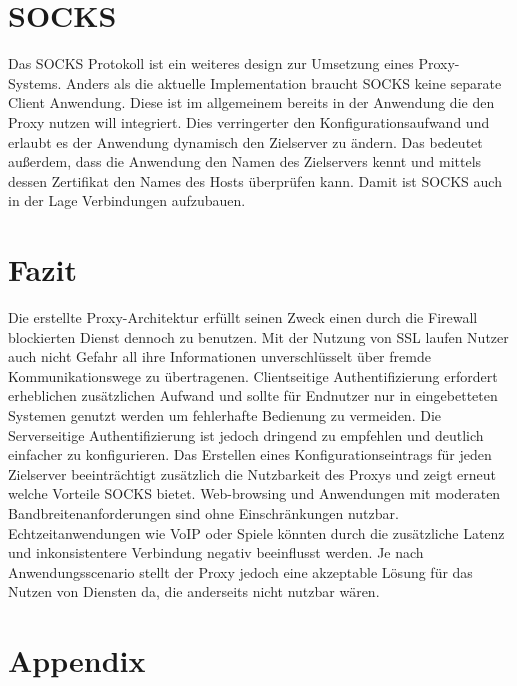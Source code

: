 \documentclass[12pt, a4paper]{scrartcl}
\begin{document}
\section{SOCKS}
Das SOCKS Protokoll ist ein weiteres design zur Umsetzung eines Proxy-Systems. Anders als die aktuelle Implementation braucht SOCKS keine separate Client Anwendung. Diese ist im allgemeinem bereits in der Anwendung die den Proxy nutzen will integriert. Dies verringerter den Konfigurationsaufwand und erlaubt es der Anwendung dynamisch den Zielserver zu ändern. Das bedeutet außerdem, dass die Anwendung den Namen des Zielservers kennt und mittels dessen Zertifikat den Names des Hosts überprüfen kann. Damit ist SOCKS auch in der Lage  Verbindungen aufzubauen.

\section{Fazit}
Die erstellte Proxy-Architektur erfüllt seinen Zweck einen durch die Firewall blockierten Dienst dennoch zu benutzen. Mit der Nutzung von \ac{SSL} laufen Nutzer auch nicht Gefahr all ihre Informationen unverschlüsselt über fremde Kommunikationswege zu übertragenen. Clientseitige Authentifizierung erfordert erheblichen zusätzlichen Aufwand und sollte für Endnutzer nur in eingebetteten Systemen genutzt werden um fehlerhafte Bedienung zu vermeiden. Die Serverseitige Authentifizierung ist jedoch dringend zu empfehlen und deutlich einfacher zu konfigurieren.\newline
Das Erstellen eines Konfigurationseintrags für jeden Zielserver beeinträchtigt zusätzlich die Nutzbarkeit des Proxys und zeigt erneut welche Vorteile SOCKS bietet. Web-browsing und Anwendungen mit moderaten Bandbreitenanforderungen sind ohne Einschränkungen nutzbar. Echtzeitanwendungen wie \ac{VoIP} oder Spiele könnten durch die zusätzliche Latenz und inkonsistentere Verbindung negativ beeinflusst werden.\newline
Je nach Anwendungsscenario stellt der Proxy jedoch eine akzeptable Lösung für das Nutzen von Diensten da, die anderseits nicht nutzbar wären.

\newpage
\renewcommand{\thesubsection}{\Alph{subsection}}
\setcounter{page}{\value{lastroman}}
\section*{Appendix}


\newpage
\listoffigures

\end{document}
